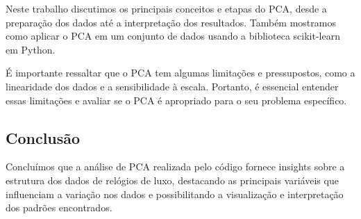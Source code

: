 \documentclass[12pt, a4paper]{article}
\begin{document}
Neste trabalho discutimos os principais conceitos e etapas do PCA, desde a preparação dos dados até a interpretação dos resultados. Também mostramos como aplicar o PCA em um conjunto de dados usando a biblioteca scikit-learn em Python.

É importante ressaltar que o PCA tem algumas limitações e pressupostos, como a linearidade dos dados e a sensibilidade à escala. Portanto, é essencial entender essas limitações e avaliar se o PCA é apropriado para o seu problema específico.



\subsection{Conclusão}
Concluímos que a análise de PCA realizada pelo código fornece insights sobre a estrutura dos dados de relógios de luxo, destacando as principais variáveis que influenciam a variação nos dados e possibilitando a visualização e interpretação dos padrões encontrados.
\end{document}
